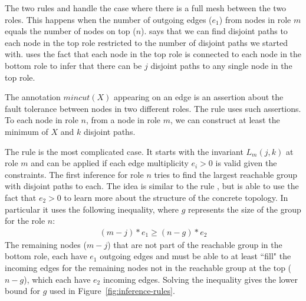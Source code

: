 \documentclass[numbers, 10pt]{sigplanconf}
\newcommand{\Mincut}{\mathit{mincut}}
\begin{document}

The two rules  and  handle the case where there is a full mesh between the two roles. This happens when the number of outgoing edges ($e_1$) from nodes in role $m$ equals the number of nodes on top ($n$).  says that we can find disjoint paths to each node in the top role restricted to the number of disjoint paths we started with.  uses the fact that each node in the top role is connected to each node in the bottom role to infer that there can be $j$ disjoint paths to any single node in the top role.

The annotation $\Mincut(X)$ appearing on an edge is an assertion about the fault tolerance between nodes in two different roles. The rule  uses such assertions. To each node in role $n$, from a node in role $m$, we can construct at least the minimum of $X$ and $k$ disjoint paths.


The rule  is the most complicated case.
It starts with the invariant $L_m(j,k)$ at role $m$ and can be applied if each edge multiplicity $e_i > 0$ is valid given the constraints. The first inference for role $n$ tries to find the largest reachable group with disjoint paths to each. The idea is similar to the rule , but is able to use the fact that $e_2 > 0$ to learn more about the structure of the concrete topology. In particular it uses the following inequality, where $g$ represents the size of the group for the role $n$:
%
\[ \begin{array}{c}
  (m-j)*e_1 \geq (n-g)*e_2
\end{array} \]
\noindent
%
The remaining nodes ($m-j$) that are not part of the reachable group in the bottom role, each have $e_1$ outgoing edges and must be able to at least ``fill" the incoming edges for the remaining nodes not in the reachable group at the top ($n-g$), which each have $e_2$ incoming edges. Solving the inequality gives the lower bound for $g$ used in Figure~\ref{fig:inference-rules}.
\end{document}
